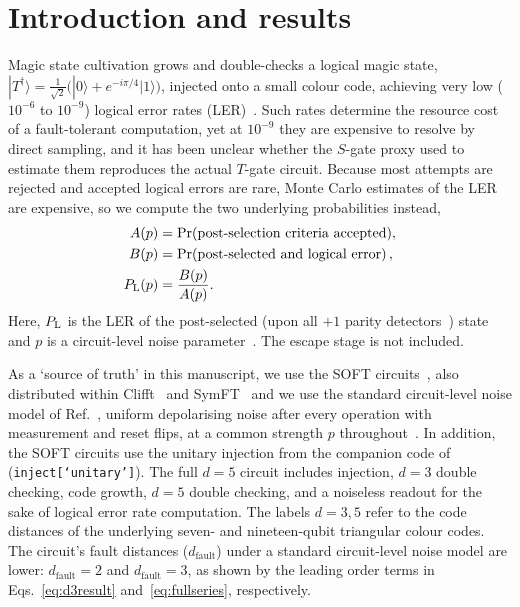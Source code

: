 \section{Introduction and results}\label{sec:results}
Magic state cultivation grows and double-checks a logical magic state, $|T^{\dagger}\rangle = \frac{1}{\sqrt{2}}\Big(|0\rangle + e^{-i\pi/4}|1\rangle\Big)$, injected onto a
small colour code, achieving very low ($10^{-6}$ to $10^{-9}$) logical error rates (LER)~\cite{msc}. Such rates determine the resource cost of a fault-tolerant computation, yet at $10^{-9}$ they are expensive to resolve by direct sampling, and it has been unclear whether the $S$-gate proxy used to estimate them reproduces the actual $T$-gate circuit. Because most attempts are rejected and accepted logical errors are rare, Monte Carlo estimates of the LER are expensive, so we compute the two underlying probabilities instead,
\begin{equation}
 \begin{aligned}
 A(p)&=\Pr(\text{post-selection criteria accepted}),\\
 B(p)&=\Pr\!\left(\text{post-selected and logical error}\right),\\
 P_{\mathrm L}(p)&=\frac{B(p)}{A(p)}.
 \end{aligned}
 \label{eq:probabilities}
\end{equation}
Here, $P_{\mathrm L}$ is the LER of the post-selected (upon all $+1$ parity detectors~\cite{msc}) state and $p$ is a circuit-level noise parameter~\cite{msc,soft,symft,clifft}. The escape stage is not included.

As a `source of truth' in this manuscript, we use the SOFT circuits~\cite{soft}, also distributed within Clifft~\cite{clifft} and SymFT~\cite{symft} and we use the standard circuit-level noise model of Ref.~\cite{msc}, uniform depolarising noise after every operation with measurement and reset flips, at a common strength $p$ throughout~\cite{msc,soft}. In addition, the SOFT circuits use the unitary injection from the companion code of~\cite{msc} (\texttt{inject[`unitary']}). The full
$d=5$ circuit includes injection, $d=3$ double checking, code growth, $d=5$ double checking, and a noiseless readout for the sake of logical error rate computation. The labels $d=3,5$ refer to the code distances of the underlying seven- and nineteen-qubit triangular colour codes. 
The circuit's fault distances ($d_{\text{fault}}$) under a standard circuit-level noise model are lower: $d_{\text{fault}}=2$ and $d_{\text{fault}}=3$, as shown by the leading order terms in Eqs.~\eqref{eq:d3result} and~\eqref{eq:fullseries}, respectively.

